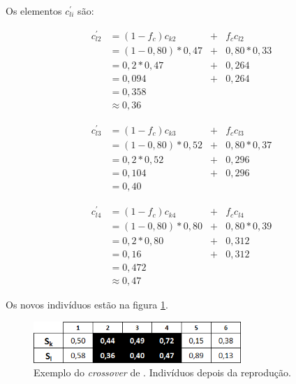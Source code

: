 	
	Os elementos $c^{'}_{li}$ são:
	
	\begin{equation}
		\begin{array}{llcl}
			c^{'}_{l2}	& = (1 - f_c) c_{k2} 		& + & f_c c_{l2} \\
									& = (1 - 0,80) * 0,47		& + &	0,80 * 0,33 \\
									& = 0,2 * 0,47					& + & 0,264	\\
									& = 0,094					& + & 0,264	\\
									& = 0,358 \\
									& \approx 0,36
		\end{array}
	\end{equation}
	
	\begin{equation}
		\begin{array}{llcl}
			c^{'}_{l3}	& = (1 - f_c) c_{k3} 		& + & f_c c_{l3} \\
									& = (1 - 0,80) * 0,52		& + &	0,80 * 0,37 \\
									& = 0,2 * 0,52					& + & 0,296	\\
									& = 0,104								& + & 0,296	\\
									& = 0,40									
		\end{array}
	\end{equation}
	
	
	\begin{equation}
		\begin{array}{llcl}
			c^{'}_{l4}	& = (1 - f_c) c_{k4} 		& + & f_c c_{l4} \\
									& = (1 - 0,80) * 0,80		& + &	0,80 * 0,39 \\
									& = 0,2 * 0,80					& + & 0,312	\\
									& = 0,16								& + & 0,312	\\
									& = 0,472 \\
									& \approx 0,47
		\end{array}
	\end{equation}
	
	Os novos indivíduos estão na figura \ref{fig:cross2011_tabelaDepois}.
		
	\begin{figure}[htbp]
	\centering
		\includegraphics[width=0.70\textwidth]{figs/materiais_metodo/autovalores_com_ga/cross2011_tabelaDepois.png}
	\caption{Exemplo do \emph{crossover} de \cite{metodo2011}. Indivíduos depois da reprodução.}
	\label{fig:cross2011_tabelaDepois}
\end{figure}
	
